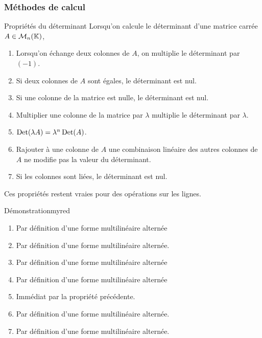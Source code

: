     \subsubsection{Méthodes de calcul}

    \begin{theo}{Propriétés du déterminant}{}
        Lorsqu’on calcule le déterminant d’une matrice carrée $A \in \mathcal{M}_{n}(\mathbb{K})$,
        \begin{enumerate}
            \item Lorsqu’on échange deux colonnes de $A$, on multiplie le déterminant par $(-1)$.
            \item Si deux colonnes de $A$ sont égales, le déterminant est nul.
            \item Si une colonne de la matrice est nulle, le déterminant est nul.
            \item Multiplier une colonne de la matrice par $\lambda$ multiplie le déterminant par $\lambda$.
            \item $\operatorname{Det}(\lambda A) = \lambda^n \operatorname{Det}(A)$.
            \item Rajouter à une colonne de $A$ une combinaison linéaire des autres colonnes de $A$ ne modifie pas la valeur du déterminant.
            \item Si les colonnes sont liées, le déterminant est nul.
        \end{enumerate}
        Ces propriétés restent vraies pour des opérations sur les lignes.
    \end{theo}

    \begin{demo}{Démonstration}{myred}
        \begin{enumerate}
            \item Par définition d’une forme multilinéaire alternée
            \item Par définition d’une forme multilinéaire alternée.
            \item Par définition d’une forme multilinéaire alternée
            \item Par définition d’une forme multilinéaire alternée
            \item Immédiat par la propriété précédente.
            \item Par définition d’une forme multilinéaire alternée.
            \item Par définition d’une forme multilinéaire alternée.
        \end{enumerate}
    \end{demo}

